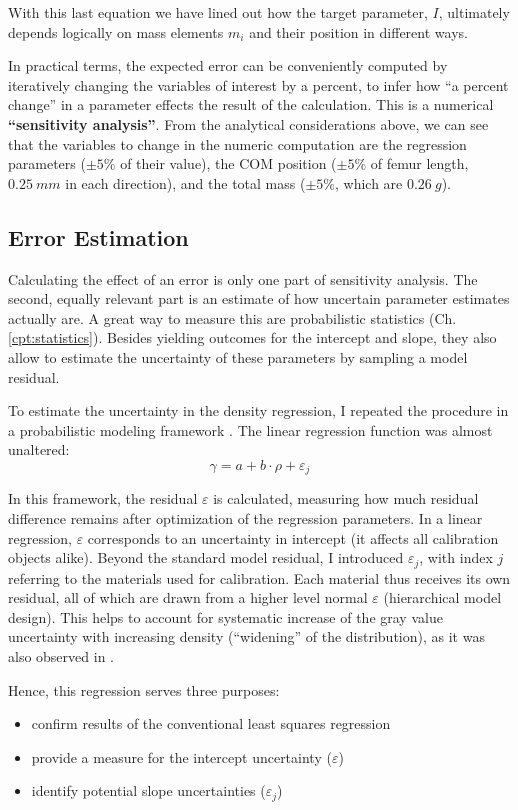 With this last equation we have lined out how the target parameter, \(I\), ultimately depends logically on mass elements \(m_{i}\) and their position in different ways.


In practical terms, the expected error can be conveniently computed by iteratively changing the variables of interest by a percent, to infer how ``a percent change'' in a parameter effects the result of the calculation.
This is a numerical \textbf{``sensitivity analysis''}.
From the analytical considerations above, we can see that the variables to change in the numeric computation are the regression parameters (\(\pm 5 \%\) of their value), the COM position (\(\pm 5 \%\) of femur length, \(0.25\ mm\) in each direction), and the total mass (\(\pm 5 \%\), which are \(0.26\ g\)).


\subsection{Error Estimation}
\label{sec:org28eec7c}
Calculating the effect of an error is only one part of sensitivity analysis.
The second, equally relevant part is an estimate of how uncertain parameter estimates actually are.
A great way to measure this are probabilistic statistics (Ch. \ref{cpt:statistics}).
Besides yielding outcomes for the intercept and slope, they also allow to estimate the uncertainty of these parameters by sampling a model residual.


To estimate the uncertainty in the density regression, I repeated the procedure in a probabilistic modeling framework \citep[PyMC, Version 5.6,][]{Salvatier2016}.
The linear regression function was almost unaltered:
\[\gamma = a+b\cdot\rho + \varepsilon_{j}\]


In this framework, the residual \(\varepsilon\) is calculated, measuring how much residual difference remains after optimization of the regression parameters.
In a linear regression, \(\varepsilon\) corresponds to an uncertainty in intercept (it affects all calibration objects alike).
Beyond the standard model residual, I introduced \(\varepsilon_{j}\), with index \(j\) referring to the materials used for calibration.
Each material thus receives its own residual, all of which are drawn from a higher level normal \(\varepsilon\) (hierarchical model design).
This helps to account for systematic increase of the gray value uncertainty with increasing density (``widening'' of the distribution), as it was also observed in \citet{DuPlessis2013}.

Hence, this regression serves three purposes:
\begin{itemize}
\item confirm results of the conventional least squares regression
\item provide a measure for the intercept uncertainty (\(\varepsilon\))
\item identify potential slope uncertainties (\(\varepsilon_{j}\))
\end{itemize}



